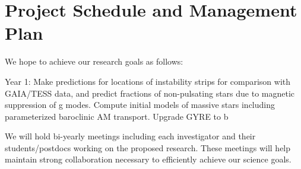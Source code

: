 \section{Project Schedule and Management Plan}

We hope to achieve our research goals as follows:

Year 1: Make predictions for locations of instability strips for comparison with GAIA/TESS data, and predict fractions of non-pulsating stars due to magnetic suppression of g modes. Compute initial models of massive stars including parameterized baroclinic AM transport.  Upgrade GYRE to b

We will  hold bi-yearly meetings including each investigator and their students/postdocs working on the proposed research. These meetings will help maintain strong collaboration necessary to efficiently achieve our science goals.
